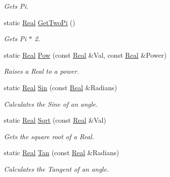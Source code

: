 \begin{DoxyCompactItemize}
\begin{DoxyCompactList}\small\item\em Gets Pi. \item\end{DoxyCompactList}\item 
static \hyperlink{namespacephys_af7eb897198d265b8e868f45240230d5f}{Real} \hyperlink{classphys_1_1MathTool_a7b3fef73ed82d585755d11a001290f65}{GetTwoPi} ()
\begin{DoxyCompactList}\small\item\em Gets Pi $\ast$ 2. \item\end{DoxyCompactList}\item 
static \hyperlink{namespacephys_af7eb897198d265b8e868f45240230d5f}{Real} \hyperlink{classphys_1_1MathTool_af2fff52ae7bc8b3607aa6a92e190a7a6}{Pow} (const \hyperlink{namespacephys_af7eb897198d265b8e868f45240230d5f}{Real} \&Val, const \hyperlink{namespacephys_af7eb897198d265b8e868f45240230d5f}{Real} \&Power)
\begin{DoxyCompactList}\small\item\em Raises a Real to a power. \item\end{DoxyCompactList}\item 
static \hyperlink{namespacephys_af7eb897198d265b8e868f45240230d5f}{Real} \hyperlink{classphys_1_1MathTool_a91b41510f0788d9304ddd112236356f9}{Sin} (const \hyperlink{namespacephys_af7eb897198d265b8e868f45240230d5f}{Real} \&Radians)
\begin{DoxyCompactList}\small\item\em Calculates the Sine of an angle. \item\end{DoxyCompactList}\item 
static \hyperlink{namespacephys_af7eb897198d265b8e868f45240230d5f}{Real} \hyperlink{classphys_1_1MathTool_af0b6902a0bf308c41213596ce95854df}{Sqrt} (const \hyperlink{namespacephys_af7eb897198d265b8e868f45240230d5f}{Real} \&Val)
\begin{DoxyCompactList}\small\item\em Gets the square root of a Real. \item\end{DoxyCompactList}\item 
static \hyperlink{namespacephys_af7eb897198d265b8e868f45240230d5f}{Real} \hyperlink{classphys_1_1MathTool_a8d5e4afe0e8e014f61bfefba2ffc0ede}{Tan} (const \hyperlink{namespacephys_af7eb897198d265b8e868f45240230d5f}{Real} \&Radians)
\begin{DoxyCompactList}\small\item\em Calculates the Tangent of an angle. \item\end{DoxyCompactList}\end{DoxyCompactItemize}
